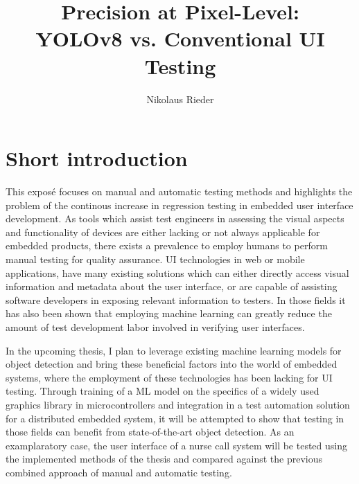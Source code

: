 \documentclass[Proposal,BIC,english,IEEE]{BASE/twbook} %
\title{Precision at Pixel-Level:\\YOLOv8 vs. Conventional UI Testing}
\author{Nikolaus Rieder}
\begin{document}
\maketitle
\chapter{Short introduction}
This exposé focuses on manual and automatic testing methods and highlights the problem of the continous increase in regression testing in embedded user interface development. As tools which assist test engineers in assessing the visual aspects and functionality of devices are either lacking or not always applicable for embedded products, there exists a prevalence to employ humans to perform manual testing for quality assurance. UI technologies in web or mobile applications, have many existing solutions which can either directly access visual information and metadata about the user interface, or are capable of assisting software developers in exposing relevant information to testers. In those fields it has also been shown that employing machine learning can greatly reduce the amount of test development labor involved in verifying user interfaces.

In the upcoming thesis, I plan to leverage existing machine learning models for object detection and bring these beneficial factors into the world of embedded systems, where the employment of these technologies has been lacking for UI testing. Through training of a ML model on the specifics of a widely used graphics library in microcontrollers and integration in a test automation solution for a distributed embedded system, it will be attempted to show that testing in those fields can benefit from state-of-the-art object detection. As an examplaratory case, the user interface of a nurse call system will be tested using the implemented methods of the thesis and compared against the previous combined approach of manual and automatic testing.
\newpage
\end{document}
